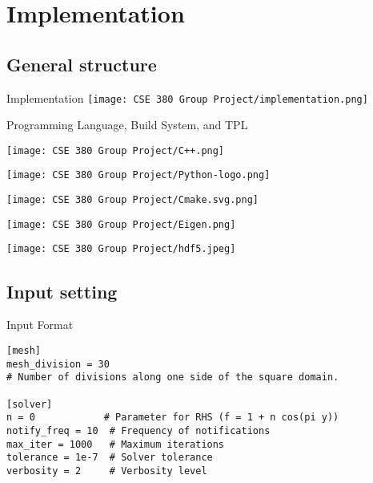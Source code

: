 \documentclass{beamer}
\begin{document}
\section{Implementation}
\subsection{General structure}
\begin{frame}{Implementation}
    \centering
    \texttt{[image: CSE 380 Group Project/implementation.png]}
\end{frame}

\begin{frame}{Programming Language, Build System, and TPL}
    \centering
    \begin{minipage}{0.3\textwidth}
        \texttt{[image: CSE 380 Group Project/C++.png]} 
    \end{minipage}
    \hfill
    \begin{minipage}{0.3\textwidth}
        \texttt{[image: CSE 380 Group Project/Python-logo.png]} 
    \end{minipage}
    \hfill
    \begin{minipage}{0.3\textwidth}
        \texttt{[image: CSE 380 Group Project/Cmake.svg.png]} 
    \end{minipage}
    \centering
    \hfill
    \begin{minipage}{0.3\textwidth}
        \texttt{[image: CSE 380 Group Project/Eigen.png]}
    \end{minipage}
    \begin{minipage}{0.4\textwidth}
        \texttt{[image: CSE 380 Group Project/hdf5.jpeg]}
    \end{minipage}
\end{frame}
\subsection{Input setting}
\begin{frame}[fragile]{Input Format}
\begin{verbatim}
[mesh]
mesh_division = 30  
# Number of divisions along one side of the square domain.

[solver]
n = 0            # Parameter for RHS (f = 1 + n cos(pi y))
notify_freq = 10  # Frequency of notifications
max_iter = 1000   # Maximum iterations
tolerance = 1e-7  # Solver tolerance
verbosity = 2     # Verbosity level
\end{verbatim}
\end{frame}
\end{document}
